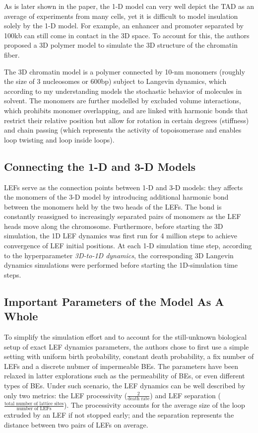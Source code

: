 \documentclass[11pt]{article}
\begin{document}
{As is later shown in the paper, the 1-D model can very well depict the TAD as an average of experiments from many cells, yet it is difficult to model insulation solely by the 1-D model. For example, an enhancer and promoter separated by 100kb can still come in contact in the 3D space. To account for this, the authors proposed a 3D polymer model to simulate the 3D structure of the chromatin fiber.

The 3D chromatin model is a polymer connected by 10-nm monomers (roughly the size of 3 nucleosomes or 600bp) subject to Langevin dynamics, which according to my understanding models the stochastic behavior of molecules in solvent. The monomers are further modelled by excluded volume interactions, which prohibits monomer overlapping, and are linked with harmonic bonds that restrict their relative position but allow for rotation in certain degrees (stiffness) and chain passing (which represents the activity of topoisomerase and enables loop twisting and loop inside loops).

\subsection{Connecting the 1-D and 3-D Models}

LEFs serve as the connection points between 1-D and 3-D models: they affects the monomers of the 3-D model by introducing additional harmonic bond between the monomers held by the two heads of the LEFs. The bond is constantly reassigned to increasingly separated pairs of monomers as the LEF heads move along the chromosome. Furthermore, before starting the 3D simulation, the 1D LEF dynamics was first run for 4 million steps to achieve convergence of LEF initial positions. At each 1-D simulation time step, according to the hyperparameter \textit{3D-to-1D dynamics}, the corresponding 3D Langevin dynamics simulations were performed before starting the 1D-simulation time steps.

\subsection{Important Parameters of the Model As A Whole}

To simplify the simulation effort and to account for the still-unknown biological setup of exact LEF dynamics parameters, the authors chose to first use a simple setting with uniform birth probability, constant death probability, a fix number of LEFs and a discrete nubmer of impermeable BEs. The parameters have been relaxed in latter explorations such as the permeability of BEs, or even different types of BEs. Under such scenario, the LEF dynamics can be well described by only two metrics: the LEF processivity ($\frac{2}{\text{death rate}}$) and LEF separation ($\frac{\text{total number of lattice sites}}{\text{number of LEFs}}$). The processivity accounts for the average size of the loop extruded by an LEF if not stopped early; and the separation represents the distance between two pairs of LEFs on average.

}
\end{document}

